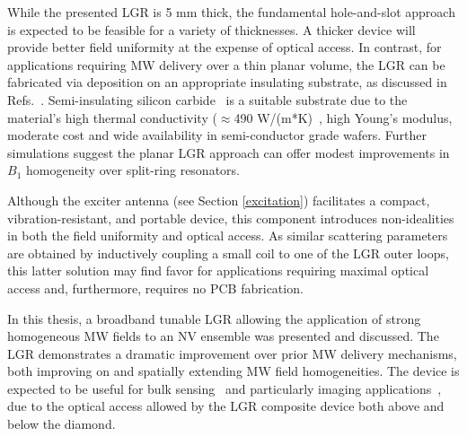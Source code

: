While the presented LGR is 5 mm thick, the fundamental hole-and-slot approach is expected to be feasible for a variety of thicknesses. A thicker device will provide better field uniformity at the expense of optical access. In contrast, for applications requiring MW delivery over a thin planar volume, the LGR can be fabricated via deposition on an appropriate insulating substrate, as discussed in Refs.~\cite{twig2013ultra,twig2010sensitive}. Semi-insulating silicon carbide~\cite{schloss2018simultaneous} is a suitable substrate due to the material's high thermal conductivity ($\approx$490 W/(m*K)~\cite{protik2017phonon,qian2017anisotropic}, high Young's modulus, moderate cost and wide availability in semi-conductor grade wafers. Further simulations suggest the planar LGR approach can offer modest improvements in $B_1$ homogeneity over split-ring resonators. 

Although the exciter antenna (see Section \ref{excitation}) facilitates a compact, vibration-resistant, and portable device, this component introduces non-idealities in both the field uniformity and optical access. As similar scattering parameters are obtained by inductively coupling a small coil to one of the LGR outer loops, this latter solution may find favor for applications requiring maximal optical access and, furthermore, requires no PCB fabrication.

In this thesis, a broadband tunable LGR allowing the application of strong homogeneous MW fields to an NV ensemble was presented and discussed. The LGR demonstrates a dramatic improvement over prior MW delivery mechanisms, both improving on and spatially extending MW field homogeneities. The device is expected to be useful for bulk sensing~\cite{acosta2009diamonds,wolf2015subpicotesla,clevenson2015broadband,chatzidrosos2017miniature,barry2016optical} and particularly imaging applications~\cite{karaveli2016modulation,glenn2015single,barry2016optical,lesage2013optical,wu2016diamond,fu2014solar,glenn2017micrometer}, due to the optical access allowed by the LGR composite device both above and below the diamond.




